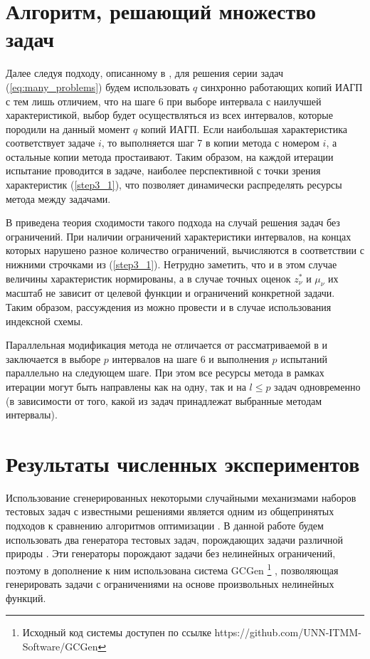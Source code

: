 \section{Алгоритм, решающий множество задач}

Далее следуя подходу, описанному в \cite{BarkalovStrongin2018}, для решения серии задач (\ref{eq:many_problems}) будем
использовать \(q\) синхронно работающих копий ИАГП с тем лишь отличием, что на шаге 6 при выборе
интервала с наилучшей характеристикой, выбор будет осуществляться из всех интервалов, которые
породили на данный момент \(q\) копий ИАГП. Если наибольшая характеристика соответствует
задаче \(i\), то выполняется шаг 7 в копии метода с номером \(i\), а остальные копии метода простаивают.
Таким образом, на каждой итерации испытание проводится в задаче, наиболее перспективной с точки зрения
характеристик (\ref{step3_1}), что позволяет динамически распределять ресурсы метода между задачами.

В \cite{BarkalovStrongin2018} приведена теория сходимости такого подхода на случай решения задач без ограничений.
При наличии ограничений характеристики интервалов, на концах которых нарушено разное количество ограничений,
вычисляются в соответствии с нижними строчками из (\ref{step3_1}). Нетрудно заметить, что и в этом случае
величины характеристик нормированы, а в случае точных оценок \(z_{\nu }^{*}\) и \(\mu _{\nu }\) их
масштаб не зависит от целевой функции и ограничений конкретной задачи. Таким образом, рассуждения
из \cite{BarkalovStrongin2018} можно провести и в случае использования индексной схемы.

Параллельная модификация метода не отличается от рассматриваемой в \cite{BarkalovStrongin2018}
и заключается в выборе \(p\) интервалов на шаге 6 и выполнения \(p\) испытаний параллельно
на следующем шаге. При этом все ресурсы метода в рамках итерации могут быть направлены как на одну, так и
на \(l\leqslant p\) задач одновременно (в зависимости от того, какой из задач принадлежат выбранные методам интервалы).

\section{Результаты численных экспериментов}

Использование сгенерированных некоторыми случайными механизмами
наборов тестовых задач с известными решениями является одним из общепринятых подходов
к сравнению алгоритмов оптимизации \cite{Beiranvand2017}. В данной работе
будем использовать два генератора тестовых задач, порождающих задачи различной природы \cite{grishaginClass, Gaviano2003}.
Эти генераторы порождают задачи без нелинейных ограничений, поэтому в дополнение к ним использована
система GCGen \footnote{Исходный код системы доступен по ссылке https://github.com/UNN-ITMM-Software/GCGen} \cite{GergelBarkalov2019}, позволяющая генерировать задачи с ограничениями на основе произвольных нелинейных
функций.

